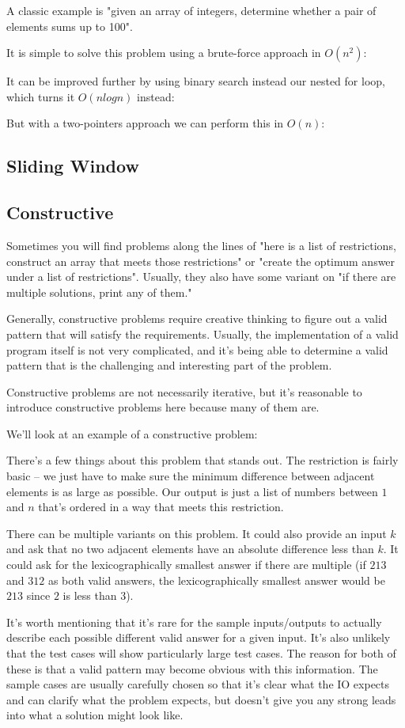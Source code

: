 A classic example is "given an array of integers, determine whether a pair of elements sums up to 100".

It is simple to solve this problem using a brute-force approach in $O(n^2)$:

It can be improved further by using binary search instead our nested for loop, which turns it $O(n log n)$ instead:

But with a two-pointers approach we can perform this in $O(n)$:

\subsection{Sliding Window}
\subsection{Constructive}

Sometimes you will find problems along the lines of "here is a list of restrictions, construct an array that meets those restrictions" or "create the optimum answer under a list of restrictions". Usually, they also have some variant on "if there are multiple solutions, print any of them."

Generally, constructive problems require creative thinking to figure out a valid pattern that will satisfy the requirements. Usually, the implementation of a valid program itself is not very complicated, and it's being able to determine a valid pattern that is the challenging and interesting part of the problem.

Constructive problems are not necessarily iterative, but it's reasonable to introduce constructive problems here because many of them are.

We'll look at an example of a constructive problem:

\hrulefill



\hrulefill

There's a few things about this problem that stands out. The restriction is fairly basic -- we just have to make sure the minimum difference between adjacent elements is as large as possible. Our output is just a list of numbers between $1$ and $n$ that's ordered in a way that meets this restriction.

There can be multiple variants on this problem. It could also provide an input $k$ and ask that no two adjacent elements have an absolute difference less than $k$. It could ask for the lexicographically smallest answer if there are multiple (if $2 1 3$ and $3 1 2$ as both valid answers, the lexicographically smallest answer would be $2 1 3$ since $2$ is less than $3$).

It's worth mentioning that it's rare for the sample inputs/outputs to actually describe each possible different valid answer for a given input. It's also unlikely that the test cases will show particularly large test cases. The reason for both of these is that a valid pattern may become obvious with this information. The sample cases are usually carefully chosen so that it's clear what the IO expects and can clarify what the problem expects, but doesn't give you any strong leads into what a solution might look like.
